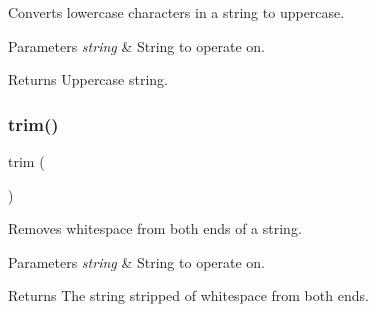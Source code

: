 Converts lowercase characters in a string to uppercase. 


\begin{DoxyParams}{Parameters}
{\em string} & String to operate on. \\
\hline
\end{DoxyParams}
\begin{DoxyReturn}{Returns}
Uppercase string. 
\end{DoxyReturn}
\mbox{\label{group__string_gaf851f60e0e4d97390e67c9c0d49e1172}} 
\subsubsection{\texorpdfstring{trim()}{trim()}}
{\footnotesize\ttfamily trim (\begin{DoxyParamCaption}\item[{string}]{ }\end{DoxyParamCaption})}



Removes whitespace from both ends of a string. 


\begin{DoxyParams}{Parameters}
{\em string} & String to operate on. \\
\hline
\end{DoxyParams}
\begin{DoxyReturn}{Returns}
The string stripped of whitespace from both ends. 
\end{DoxyReturn}
